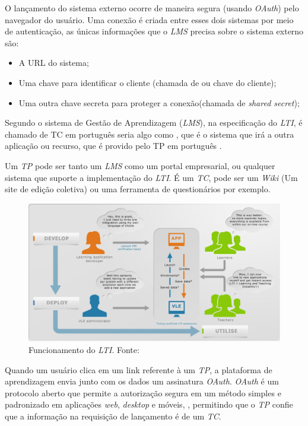O lançamento do sistema externo ocorre de maneira segura (usando \textit{OAuth}) pelo navegador do usuário. Uma conexão é criada entre esses dois sistemas por meio de autenticação, as únicas informações que o \textit{LMS} precisa sobre o sistema externo são:
\begin{itemize}
    \item A \ac{URL} do sistema;
    \item Uma chave para identificar o cliente (chamada de \textit{} ou chave do cliente);
    \item Uma outra chave secreta para proteger a conexão(chamada de \textit{shared secret});
\end{itemize}

Segundo  o sistema de Gestão de Aprendizagem (\textit{LMS}), na especificação do \textit{LTI}, é chamado de \ac{TC} em português seria algo como , que é o sistema que irá  a outra aplicação ou recurso, que é provido pelo \ac{TP} em português .

Um \textit{TP} pode ser tanto um \textit{LMS} como um portal empresarial, ou qualquer sistema que suporte a implementação do \textit{LTI}. É um \textit{TC}, pode ser um \textit{Wiki} (Um site de edição coletiva) ou uma ferramenta de questionários por exemplo.
\begin{figure}[h]
    \centering
    \label{fig:ims-lti-funcionamento}
    \includegraphics[keepaspectratio=true,scale=0.5]{figuras/ims-lti-funcionamento.png}
    \caption{Funcionamento do \textit{LTI}. Fonte: }
\end{figure}

Quando um usuário clica em um link referente à um \textit{TP}, a plataforma de aprendizagem envia junto com os dados um assinatura \textit{OAuth}. \textit{OAuth} é um protocolo aberto que permite a autorização segura em um método simples e padronizado em aplicações \textit{web}, \textit{desktop} e móveis, \cite{oauth}, permitindo que o \textit{TP} confie que a informação na requisição de lançamento é de um \textit{TC}.

